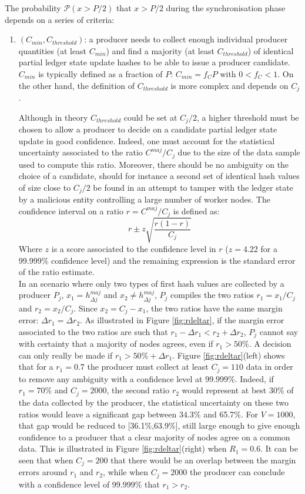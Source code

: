 The probability $\mathcal{P}(x>P/2)$ that $x >P/2$ during the synchronisation phase depends on a series of criteria:
\begin{enumerate}
\item $(C_{min}, C_{threshold})$: a producer needs to collect enough individual producer quantities (at least $C_{min}$) and find a majority (at least $C_{threshold}$) of identical partial ledger state update hashes to be able to issue a producer candidate. 
$C_{min}$ is typically defined as a fraction of $P$: $C_{min} = f_C P$ with $0 < f_C < 1$. On the other hand, the definition of $C_{threshold}$ is more complex and depends on $C_j$. 

 Although in theory $C_{threshold}$ could be set at $C_j/2$, a higher threshold must be chosen to allow a producer to decide on a candidate partial ledger state update in good confidence. Indeed, one must account for the statistical uncertainty associated to the ratio $C^{maj}/C_j$ due to the size of the data sample used to compute this ratio. Moreover, there should be no ambiguity on the choice of a candidate, should for instance a second set of identical hash values of size close to $C_j/2$ be found in an attempt to tamper with the ledger state by a malicious entity controlling a large number of worker nodes. The confidence interval on a ratio $r=C^{maj}/C_j$ is defined as:
 \begin{equation}
 r \pm z\sqrt{\frac{r(1-r)}{C_j}}
 \end{equation}
 Where $z$ is a score associated to the confidence level in $r$ ($z=4.22$ for a 99.999\% confidence level) and the remaining expression is the standard error of the ratio estimate. \\
 
 In an scenario where only two types of first hash values are collected by a producer $P_j$, $x_1 =h^{maj}_{\Delta j}$ and $x_2 \neq h^{maj}_{\Delta j}$, $P_j$ compiles the two ratios $r_1 = x_1/C_j$ and $r_2 = x_2 /C_j$. Since $x_2 = C_j - x_1$, the two ratios have the same margin error: $\Delta r_1 = \Delta r_2$. As illustrated in Figure \ref{fig:rdeltar}, if the margin error associated to the two ratios are such that $r_1 - \Delta r_1 < r_2 + \Delta r_2$, $P_j$ cannot say with certainty that a majority of nodes agrees, even if $r_1 > 50\%$. A decision can only really be made if $r_1 > 50\% + \Delta r_1$. Figure \ref{fig:rdeltar}(left) shows that for a $r_{1} = 0.7$ the producer must collect at least $C_j=110$ data in order to remove any ambiguity with a confidence level at 99.999\%. Indeed, if $r_1 = 70\%$ and $C_j=2000$, the second ratio $r_2$ would represent at best 30\% of the data collected by the producer, the statistical uncertainty on these two ratios would leave a significant gap between 34.3\% and 65.7\%. For $V= 1000$, that gap would be reduced to [36.1\%,63.9\%], still large enough to give enough confidence to a producer that a clear majority of nodes agree on a common data. This is illustrated in Figure \ref{fig:rdeltar}(right) when $R_1 = 0.6$. It can be seen that when $C_j = 200$ that there would be an overlap between the margin errors around $r_1$ and $r_2$, while when $C_j = 2000$ the producer can conclude with a confidence level of 99.999\% that $r_1 > r_2$.\\


\end{enumerate}
